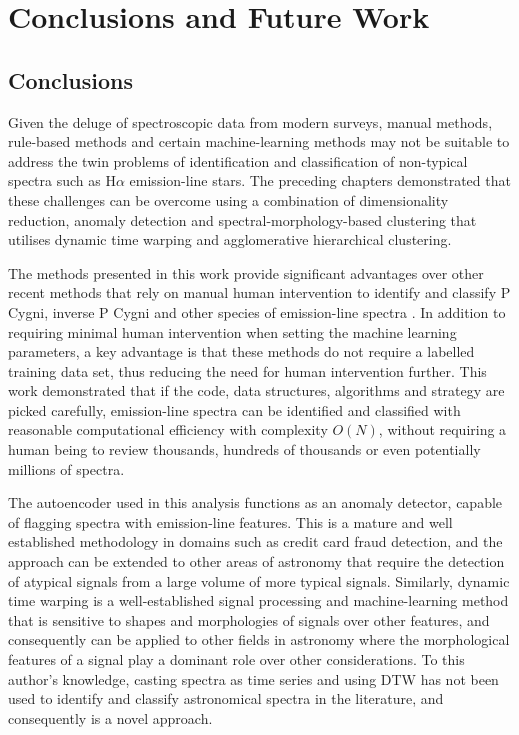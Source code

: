 \chapter{Conclusions and Future Work}

\section{Conclusions}

Given the deluge of spectroscopic data from modern surveys, manual methods, rule-based methods and certain machine-learning methods may not be suitable to address the twin problems of identification and classification of non-typical spectra such as H$\alpha$ emission-line stars. The preceding chapters demonstrated that these challenges can be overcome using a combination of dimensionality reduction, anomaly detection and spectral-morphology-based clustering that utilises dynamic time warping and agglomerative hierarchical clustering. 

The methods presented in this work provide significant advantages over other recent methods that rely on manual human intervention to identify and classify P Cygni, inverse P Cygni and other species of emission-line spectra \citep{zhang2021catalog, zhao2012lamost}. In addition to requiring minimal human intervention when setting the machine learning parameters, a key advantage is that these methods do not require a labelled training data set, thus reducing the need for human intervention further.  This work demonstrated that if the code, data structures, algorithms and strategy are picked carefully, emission-line spectra can be identified and classified with reasonable computational efficiency with complexity $O(N)$, without requiring a human being to review thousands, hundreds of thousands  or even potentially millions of spectra.

The autoencoder used in this analysis functions as an anomaly detector, capable of flagging spectra with emission-line features. This is a mature and well established methodology in domains such as credit card fraud detection, and the approach can be extended to other areas of astronomy that require the detection of atypical signals from a large volume of more typical signals. Similarly, dynamic time warping is a well-established signal processing and machine-learning method that is sensitive to shapes and morphologies of signals over other features, and consequently can be applied to other fields in astronomy where the morphological features of a signal play a dominant role over other considerations. To this author's knowledge, casting spectra as time series and using DTW has not been used to identify and classify astronomical spectra in the literature, and consequently is a novel approach. 

